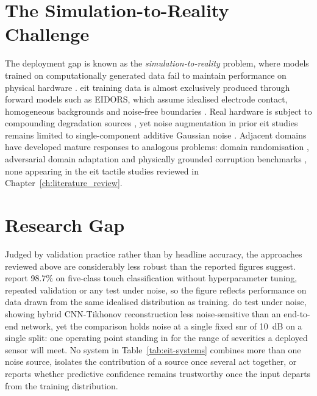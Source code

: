 \section{The Simulation-to-Reality Challenge}
\label{sec:intro-sim2real}

The deployment gap is known as the \emph{simulation-to-reality} problem, where models trained on computationally generated data fail to maintain performance on physical hardware \parencite{pan2010survey}. \gls{eit} training data is almost exclusively produced through forward models such as EIDORS, which assume idealised electrode contact, homogeneous backgrounds and noise-free boundaries \parencite{adler2006}. Real hardware is subject to compounding degradation sources \parencite{adler2006, vilhunen2002, kolehmainen1997}, yet noise augmentation in prior \gls{eit} studies remains limited to single-component additive Gaussian noise \parencite{chen2023, park2022skin}. Adjacent domains have developed mature responses to analogous problems: domain randomisation \parencite{tobin2017}, adversarial domain adaptation \parencite{ganin2016, tzeng2017adda} and physically grounded corruption benchmarks \parencite{hendrycks2019, rusak2020simple}, none appearing in the \gls{eit} tactile studies reviewed in Chapter~\ref{ch:literature_review}.

\section{Research Gap}
\label{sec:intro-gap}

Judged by validation practice rather than by headline accuracy, the approaches reviewed above are considerably less robust than the reported figures suggest. \textcite{park2022skin} report 98.7\% on five-class touch classification without hyperparameter tuning, repeated validation or any test under noise, so the figure reflects performance on data drawn from the same idealised distribution as training. \textcite{chen2023} do test under noise, showing hybrid CNN-Tikhonov reconstruction less noise-sensitive than an end-to-end network, yet the comparison holds noise at a single fixed \gls{snr} of 10~dB on a single split: one operating point standing in for the range of severities a deployed sensor will meet. No system in Table~\ref{tab:eit-systems} combines more than one noise source, isolates the contribution of a source once several act together, or reports whether predictive confidence remains trustworthy once the input departs from the training distribution.

